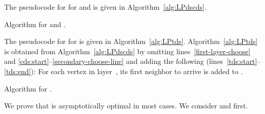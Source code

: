 The pseudocode for \alayersparent for \ds and \cds is given in
Algorithm~\ref{alg:LPdscds}.

\begin{algorithm} \DontPrintSemicolon
\SetNoFillComment
\SetAlgoNoLine
{}
{\normalsize
\BlankLine
   \;
   }
 \caption{Algorithm \alayersparent for \ds and \cds.\label{alg:LPdscds}}
\end{algorithm}

The pseudocode for \alayersparent for \tds is given in Algorithm~\ref{alg:LPtds}.
Algorithm~\ref{alg:LPtds} is obtained from Algorithm~\ref{alg:LPdscds} by omitting lines~\ref{first-layer-choose} and
\ref{cds:start}--\ref{secondary-choose-line}
and adding the following (lines~\ref{tds:start}--\ref{tds:end}):
For each vertex in layer~, its first neighbor  to arrive is added
to .


\begin{algorithm} \DontPrintSemicolon
\SetNoFillComment
\SetAlgoNoLine
{}
{\normalsize
\BlankLine
   \;
   }
 \caption{Algorithm \alayersparent for \tds.\label{alg:LPtds}}
\end{algorithm}


We prove that \alayersparent is asymptotically optimal in most cases.
We consider \ds and \cds first.


